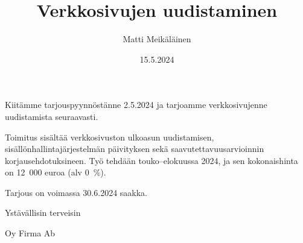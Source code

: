 \documentclass{sfs-2487-2024}
\date{15.5.2024}
\author{Matti Meikäläinen}
\title{Verkkosivujen uudistaminen}
\begin{document}
\maketitle

Kiitämme tarjouspyynnöstänne 2.5.2024 ja tarjoamme verkkosivujenne
uudistamista seuraavasti.

Toimitus sisältää verkkosivuston ulkoasun uudistamisen,
sisällönhallintajärjestelmän päivityksen sekä saavutettavuusarvioinnin
korjausehdotuksineen. Työ tehdään touko--elokuussa 2024, ja sen
kokonaishinta on 12~000 euroa (alv 0~\%).

Tarjous on voimassa 30.6.2024 saakka.

Ystävällisin terveisin

Oy Firma Ab


\makecontactinfo
\end{document}
